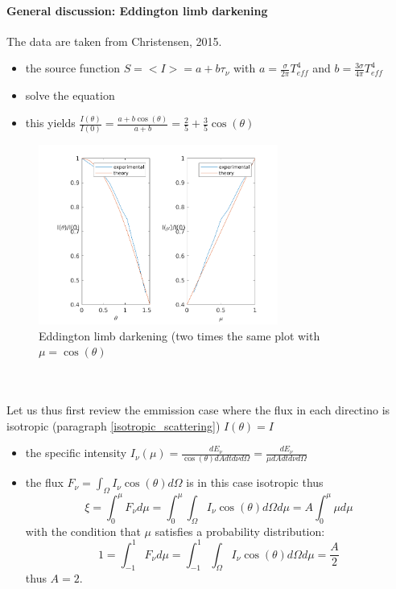\documentclass[../main/main.tex]{subfiles}
\begin{document}
\paragraph{General discussion: Eddington limb darkening}
The data are taken from Christensen, 2015.
\begin{itemize}
\item the source function $S= <I> = a + b\tau_{\nu}$ with $a= \frac{\sigma}{2 \pi}T_{eff}^4$ and $b = \frac{3 \sigma}{4 \pi}T_{eff}^4$
\item solve the equation
\item this yields $\frac{I(\theta)}{I(0)} = \frac{a+b\cos(\theta)}{a+b} = \frac{2}{5} + \frac{3}{5}\cos(\theta)$
\end{itemize}
\begin{figure}[!htp]
\centering
\includegraphics[width=0.7\textwidth]{../../introductory_exercises/P_Cygni_profile_UV_resonance/Eddington_limb_darkening.png}
\caption{Eddington limb darkening (two times the same plot with $\mu =  \cos(\theta)$ }
\end{figure}

\noindent{} \\
\\
Let us thus first review the emmission case where the flux in each directino is isotropic (paragraph \ref{isotropic_scattering}) $I(\theta) = I$
\begin{itemize}
\item the specific intensity $I_{\nu}(\mu) = \frac{dE_{\nu}}{\cos(\theta) dA dt d\nu d\Omega} = \frac{dE_{\nu}}{\mu dA dt d\nu d\Omega}$ 
\item the flux $F_{\nu} = \int_{\Omega} I_{\nu} \cos(\theta) d\Omega$ is in this case isotropic thus
\begin{equation}
\xi = \int_0^{\mu} F_{\nu} d\mu = \int_0^{\mu} \int_{\Omega} I_{\nu} \cos(\theta) d\Omega d\mu = A \int_0^{\mu} \mu d\mu   
\end{equation}
with the condition that $\mu$ satisfies a probability distribution: 
\begin{equation}
1 = \int_{-1}^{1} F_{\nu} d\mu = \int_{-1}^{1} \int_{\Omega} I_{\nu} \cos(\theta) d\Omega d\mu = \frac{A}{2}
\label{isotropic_flux_isotropic_intensity_prob_dist}
\end{equation}
thus $A=2$.
\end{itemize}
\end{document}
